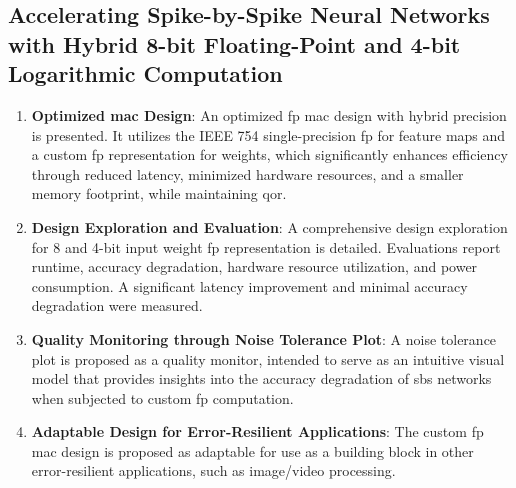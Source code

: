 \subsection{Accelerating Spike-by-Spike Neural Networks with Hybrid 8-bit Floating-Point and 4-bit Logarithmic Computation}
\begin{enumerate}
	\item \textbf{Optimized \gls{mac} Design}: 
	An optimized \gls{fp} \gls{mac} design with hybrid precision is presented. It utilizes the IEEE 754 single-precision \gls{fp} for feature maps and a custom \gls{fp} representation for weights, which significantly enhances efficiency through reduced latency, minimized hardware resources, and a smaller memory footprint, while maintaining \gls{qor}.
	
	\item \textbf{Design Exploration and Evaluation}: 
	A comprehensive design exploration for 8 and 4-bit input weight \gls{fp} representation is detailed. Evaluations report runtime, accuracy degradation, hardware resource utilization, and power consumption. A significant latency improvement and minimal accuracy degradation were measured.
	
	\item \textbf{Quality Monitoring through Noise Tolerance Plot}: 
	A noise tolerance plot is proposed as a quality monitor, intended to serve as an intuitive visual model that provides insights into the accuracy degradation of \gls{sbs} networks when subjected to custom \gls{fp} computation.
	
	\item \textbf{Adaptable Design for Error-Resilient Applications}: 
	The custom \gls{fp} \gls{mac} design is proposed as adaptable for use as a building block in other error-resilient applications, such as image/video processing.
\end{enumerate}

